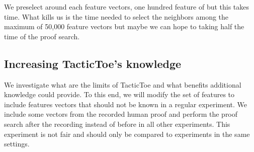 \documentclass[runningheads,a4paper,draft]{svjour3}
\def\tactictoe{\textsf{TacticToe}\xspace}
\newcommand{\ra}[1]{\renewcommand{\arraystretch}{#1}}
\begin{document}
%


We preselect around each feature vectors, one hundred feature of but this takes 
time. What kills us is the time needed to select the neighbors among the 
maximum of 50,000 feature vectors but maybe we can hope to 
taking half the time of the proof search.


\subsection{Increasing \tactictoe's knowledge}\label{sec:perfect_exp}

We investigate what are the limits of \tactictoe and what benefits additional 
knowledge could provide. To this end, we will modify the set of features to 
include features vectors that should not be known in a regular experiment. We  
include some vectors from the recorded human proof and perform the proof search 
after the recording instead of before in all other experiments. This experiment 
is not fair and should only be compared to 
experiments in the same settings.
\end{document}

